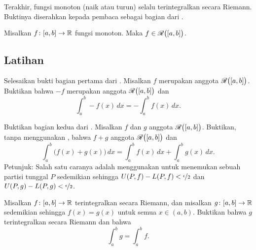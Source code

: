 Terakhir, fungsi monoton (naik atau turun) selalu
terintegralkan secara Riemann.  Buktinya diserahkan kepada pembaca sebagai bagian dari
.

\begin{prop} \label{prop:monotoneintegrable}
Misalkan $f \colon [a,b] \to {\mathbb{R}}$ fungsi monoton.  Maka $f \in
{\mathscr{R}}\bigl([a,b]\bigr)$.
\end{prop}

\subsection{Latihan}

\begin{exercise} \label{exercise:proofoflinpropparti}
Selesaikan bukti bagian pertama dari .
Misalkan $f$ merupakan anggota ${\mathscr{R}}\bigl([a,b]\bigr)$.  Buktikan bahwa
$-f$ merupakan anggota ${\mathscr{R}}\bigl([a,b]\bigr)$ dan 
\begin{equation*}
\int_a^b - f(x) \,dx = - \int_a^b f(x) \,dx .
\end{equation*}
\end{exercise}

\begin{exercise} \label{exercise:proofoflinproppartii}
Buktikan bagian kedua dari .
Misalkan $f$ dan $g$ anggota ${\mathscr{R}}\bigl([a,b]\bigr)$.
Buktikan, tanpa menggunakan , bahwa $f+g$ anggota
${\mathscr{R}}\bigl([a,b]\bigr)$ dan
\begin{equation*}
\int_a^b \bigl( f(x)+g(x) \bigr) \,dx = 
\int_a^b f(x) \,dx 
+
\int_a^b g(x) \,dx .
\end{equation*}
Petunjuk: Salah satu caranya adalah menggunakan  untuk menemukan sebuah partisi tunggal $P$
sedemikian sehingga $U(P,f)-L(P,f) < \nicefrac{\epsilon}{2}$ dan
$U(P,g)-L(P,g) < \nicefrac{\epsilon}{2}$.
\end{exercise}

\begin{exercise} \label{exercise:changeendpointsintegral}
Misalkan $f \colon [a,b] \to {\mathbb{R}}$ terintegralkan secara Riemann, dan misalkan $g \colon [a,b] \to {\mathbb{R}}$
sedemikian sehingga $f(x) = g(x)$ untuk semua $x \in (a,b)$.
Buktikan bahwa $g$ terintegralkan secara Riemann dan bahwa
\begin{equation*}
\int_a^b g = \int_a^b f.
\end{equation*}
\end{exercise}

